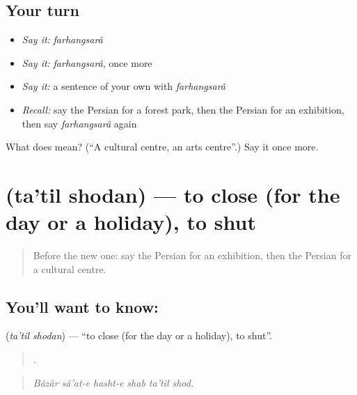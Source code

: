 \subsection*{Your turn}
\begin{itemize}
\raggedright
  \item \emph{Say it:} \emph{farhangsarâ}
  \item \emph{Say it:} \emph{farhangsarâ}, once more
  \item \emph{Say it:} a sentence of your own with \emph{farhangsarâ}
  \item \emph{Recall:} say the Persian for a forest park, then the Persian for an exhibition, then say \emph{farhangsarâ} again
\end{itemize}

\begin{tcolorbox}[breakable,colback=teal!4,colframe=teal!35!black,title={Before you move on}]
What does  mean? (\textquotedblleft{}A cultural centre, an arts centre\textquotedblright{}.) Say it once more.
\end{tcolorbox}
\section[\texorpdfstring{\fa{تعطیل} \fa{شدن} (ta'til shodan)}{تعطیل شدن (ta'til shodan)}]{  (ta'til shodan) — to close (for the day or a holiday), to shut}

\label{lesson:FA-C455-tatil-shodan}



\begin{quote}
Before the new one: say the Persian for an exhibition, then the Persian for a cultural centre.
\end{quote}

\subsection*{You'll want to know:  }
\textbf{ } (\emph{ta'til shodan}) — \textquotedblleft{}to close (for the day or a holiday), to shut\textquotedblright{}.

\begin{quote}
     .
\end{quote}

\begin{quote}
\emph{Bâzâr sâ'at-e hasht-e shab ta'til shod.}
\end{quote}

